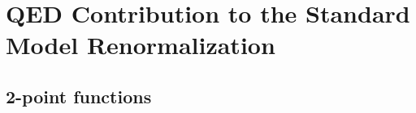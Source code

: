 \section{QED Contribution to the Standard Model Renormalization}
\label{sec:SMrenorm}
\subsection{2-point functions}

